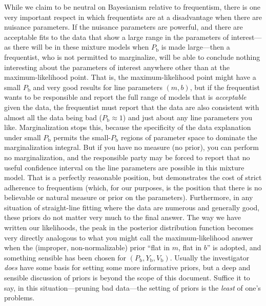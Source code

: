 \documentclass[12pt,twoside]{article}
\newcommand{\documentname}{document}
\newcounter{problem}
\newcommand{\Pbad}{P_{\mathrm{b}}}
\newcommand{\Ybad}{Y_{\mathrm{b}}}
\newcommand{\Vbad}{V_{\mathrm{b}}}
\begin{document}
{  While we claim to be neutral on Bayesianism relative to frequentism,
  there is one very important respect in which frequentists are at a
  disadvantage when there are nuisance parameters.  If the nuisance
  parameters are powerful, and there are acceptable fits to the data
  that show a large range in the parameters of interest---as there
  will be in these mixture models when $\Pbad$ is made large---then a
  frequentist, who is not permitted to marginalize, will be able to
  conclude nothing interesting about the parameters of interest
  anywhere other than at the maximum-likelihood point.  That is, the
  maximum-likelihood point might have a small $\Pbad$ and very good
  results for line parameters $(m,b)$, but if the frequentist wants to
  be responsible and report the full range of models that is
  \emph{acceptable} given the data, the frequentist must report that
  the data are also consistent with almost all the data being bad
  ($\Pbad\approx 1$) and just about any line parameters you like.
  Marginalization stops this, because the specificity of the data
  explanation under small $\Pbad$ permits the small-$\Pbad$ regions of
  parameter space to dominate the marginalization integral.  But if
  you have no measure (no prior), you can perform no marginalization,
  and the responsible party may be forced to report that no useful
  confidence interval on the line parameters are possible in this
  mixture model.  That is a perfectly reasonable position, but
  demonstrates the cost of strict adherence to frequentism (which, for
  our purposes, is the position that there is no believable or natural
  measure or prior on the parameters).}  Furthermore, in any situation
of straight-line fitting where the data are numerous and generally
good, these priors do not matter very much to the final answer.  The
way we have written our likelihoods, the peak in the posterior
distribution function becomes very directly analogous to what you
might call the maximum-likelihood answer when the (improper,
non-normalizable) prior ``flat in $m$, flat in $b$'' is adopted, and
something sensible has been chosen for $(\Pbad,\Ybad,\Vbad)$.  Usually
the investigator \emph{does} have some basis for setting some more
informative priors, but a deep and sensible discussion of priors is
beyond the scope of this \documentname.  Suffice it to say, in this
situation---pruning bad data---the setting of priors is the
\emph{least} of one's problems.
\end{document}
